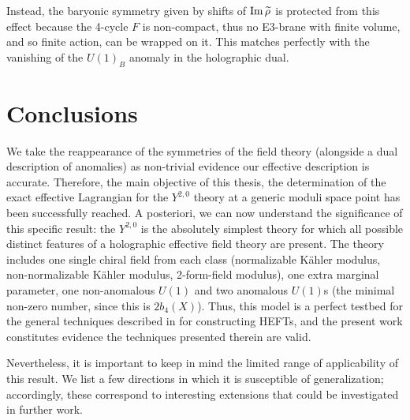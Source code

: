 Instead, the baryonic symmetry given by shifts of $\operatorname{Im}\widetilde{\rho}$ is protected from this effect because the 4-cycle $F$ is non-compact, thus no E3-brane with finite volume, and so finite action, can be wrapped on it. This matches perfectly with the vanishing of the $U(1)_B$ anomaly in the holographic dual.

\section{Conclusions}

We take the reappearance of the symmetries of the field theory (alongside a dual description of anomalies) as non-trivial evidence our effective description is accurate. Therefore, the main objective of this thesis, the determination of the exact effective Lagrangian for the $Y^{2,0}$ theory at a generic moduli space point has been successfully reached. A posteriori, we can now understand the significance of this specific result: the $Y^{2,0}$ is the absolutely simplest theory for which all possible distinct features of a holographic effective field theory are present. The theory includes one single chiral field from each class (normalizable K\"ahler modulus, non-normalizable K\"ahler modulus, 2-form-field modulus), one extra marginal parameter, one non-anomalous $U(1)$ and two anomalous $U(1)$s (the minimal non-zero number, since this is $2b_4(X)$). Thus, this model is a perfect testbed for the general techniques described in \cite{MZ} for constructing HEFTs, and the present work constitutes evidence the techniques presented therein are valid.

Nevertheless, it is important to keep in mind the limited range of applicability of this result. We list a few directions in which it is susceptible of generalization; accordingly, these correspond to interesting extensions that could be investigated in further work.

